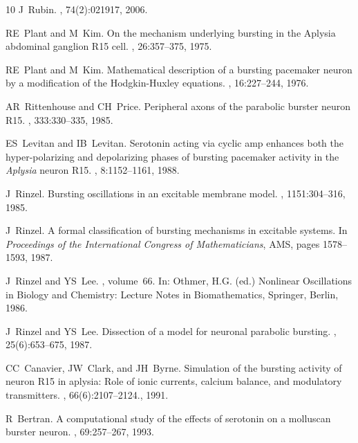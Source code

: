 \documentclass[nofootinbib,aip,amsmath,amssymb,preprint,twocolumn,floatfix,10pt]{revtex4-2}
\begin{document}
\begin{thebibliography}{10}
J~Rubin.
, 74(2):021917, 2006.

RE~Plant and M~Kim.
\newblock On the mechanism underlying bursting in the Aplysia abdominal
  ganglion R15 cell.
, 26:357--375, 1975.

RE~Plant and M~Kim.
\newblock Mathematical description of a bursting pacemaker neuron by a
  modification of the Hodgkin-Huxley equations.
, 16:227--244, 1976.

AR~Rittenhouse and CH~Price.
\newblock Peripheral axons of the parabolic burster neuron R15.
, 333:330--335, 1985.

ES~Levitan and IB~Levitan.
\newblock Serotonin acting via cyclic amp enhances both the hyper-polarizing and
  depolarizing phases of bursting pacemaker activity in the {\em Aplysia} neuron
  {R}15.
, 8:1152--1161, 1988.

J~Rinzel.
\newblock Bursting oscillations in an excitable membrane model.
, 1151:304--316, 1985.


J~Rinzel.
\newblock A formal classification of bursting mechanisms in excitable systems.
\newblock In {\em Proceedings of the International Congress of Mathematicians}, AMS, pages 1578--1593, 1987.

J~Rinzel and YS~Lee.
,
  volume~66.
\newblock In: Othmer, H.G. (ed.) Nonlinear Oscillations in Biology and
  Chemistry: Lecture Notes in Biomathematics, Springer, Berlin, 1986.

J~Rinzel and YS~Lee.
\newblock Dissection of a model for neuronal parabolic bursting.
, 25(6):653--675, 1987.


CC~Canavier, JW~Clark, and JH~Byrne.
\newblock Simulation of the bursting activity of neuron {R}15 in aplysia: Role
  of ionic currents, calcium balance, and modulatory transmitters.
, 66(6):2107--2124., 1991.

R~Bertran.
\newblock A computational study of the effects of serotonin on a molluscan
  burster neuron.
, 69:257--267, 1993.


\end{thebibliography}
\end{document}
